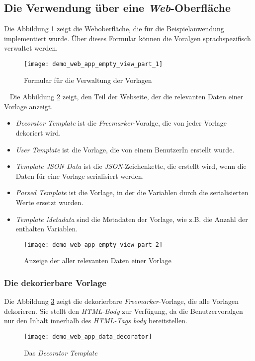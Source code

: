 \subsection{Die Verwendung über eine \emph{Web}-Oberfläche}
Die Abbildung \ref{fig:demo_web_app_empty_view_part_1} zeigt die Weboberfläche, die für die Beispielanwendung implementiert wurde. Über dieses Formular können die Voralgen sprachspezifisch verwaltet werden.
\ \begin{figure}[h]
\centering
\texttt{[image: demo\_web\_app\_empty\_view\_part\_1]}
\caption{Formular für die Verwaltung der Vorlagen}
\label{fig:demo_web_app_empty_view_part_1}
\end{figure}
\ \newline
Die Abbildung \ref{fig:demo_web_app_empty_view_part_2} zeigt, den Teil der Webseite, der die relevanten Daten einer Vorlage anzeigt.
\begin{itemize}
	\item\emph{Decorator Template} ist die \emph{Freemarker}-Voralge, die von jeder Vorlage dekoriert wird.
	\item\emph{User Template} ist die Vorlage, die von einem BenutzerIn erstellt wurde.
	\item\emph{Template JSON Data} ist die \emph{JSON}-Zeichenkette, die erstellt wird, wenn die Daten für eine Vorlage serialisiert werden.
	\item\emph{Parsed Template} ist die Vorlage, in der die Variablen durch die serialisierten Werte ersetzt wurden.
	\item\emph{Template Metadata} sind die Metadaten der Vorlage, wie z.B. die Anzahl der enthalten Variablen.
\end{itemize}
\begin{figure}[h]
\centering
\texttt{[image: demo\_web\_app\_empty\_view\_part\_2]}
\caption{Anzeige der aller relevanten Daten einer Vorlage}
\label{fig:demo_web_app_empty_view_part_2}
\end{figure}

\subsubsection{Die dekorierbare Vorlage}
Die Abbildung \ref{fig:demo_web_app_data_decorator} zeigt die dekorierbare \emph{Freemarker}-Vorlage, die alle Vorlagen dekorieren. Sie stellt den \emph{HTML-Body} zur Verfügung, da die Benutzervoralgen nur den Inhalt innerhalb des \emph{HTML-Tags body} bereitstellen.
\begin{figure}[h]
\centering
\texttt{[image: demo\_web\_app\_data\_decorator]}
\caption{Das \emph{Decorator Template}}
\label{fig:demo_web_app_data_decorator}
\end{figure}
\ \newpage

